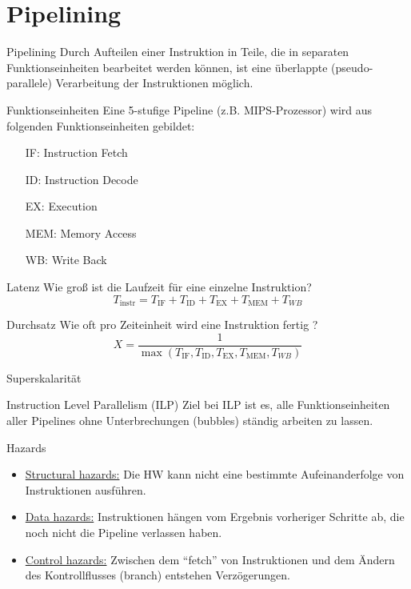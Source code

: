 
\section{Pipelining}

\begin{defi}{Pipelining}
    Durch Aufteilen einer Instruktion in Teile, 
    die in separaten Funktionseinheiten bearbeitet werden können, 
    ist eine überlappte (pseudo-parallele) Verarbeitung der Instruktionen möglich.
\end{defi}

\begin{defi}[Pipelining]{Funktionseinheiten}
    Eine 5-stufige Pipeline (z.B. MIPS-Prozessor) wird aus folgenden Funktionseinheiten gebildet:
    \begin{itemize}
        \item[IF:] Instruction Fetch
        \item[ID:] Instruction Decode
        \item[EX:] Execution
        \item[MEM:] Memory Access
        \item[WB:] Write Back
    \end{itemize}
\end{defi}

\begin{defi}[Pipelining]{Latenz}
    Wie groß ist die Laufzeit für eine einzelne Instruktion?
    \[T_\text{instr} = T_\text{IF} + T_\text{ID} + T_\text{EX} + T_\text{MEM} + T_{WB}\]
\end{defi}

\begin{defi}[Pipelining]{Durchsatz}
    Wie oft pro Zeiteinheit wird eine Instruktion fertig ?
    \[X = \frac{1}{\max(T_\text{IF}, T_\text{ID}, T_\text{EX}, T_\text{MEM}, T_{WB})}\]
\end{defi}

\begin{defi}{Superskalarität}
    
\end{defi}

\begin{defi}{Instruction Level Parallelism (ILP)}
    Ziel bei ILP ist es, 
    alle Funktionseinheiten aller Pipelines ohne Unterbrechungen (bubbles) ständig arbeiten zu lassen.
\end{defi}

\begin{defi}{Hazards}
    \begin{itemize}
        \item \underline{Structural hazards:}
              Die HW kann nicht eine bestimmte Aufeinanderfolge von Instruktionen ausführen.
        \item \underline{Data hazards:}
              Instruktionen hängen vom Ergebnis vorheriger Schritte ab, 
              die noch nicht die Pipeline verlassen haben.
        \item \underline{Control hazards:}
              Zwischen dem \enquote{fetch} von Instruktionen und dem Ändern des Kontrollflusses (branch) entstehen Verzögerungen.
    \end{itemize}
\end{defi}

